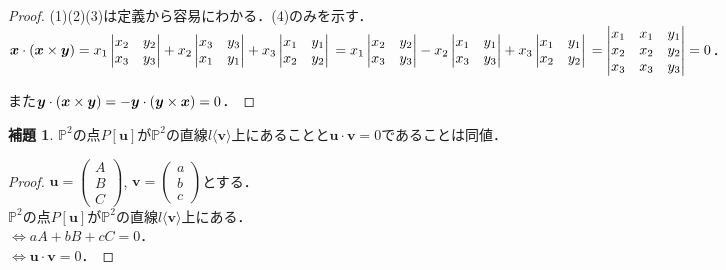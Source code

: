 \documentclass{jsarticle}
\theoremstyle{definition}
\newtheorem{lemma}[theorem]{補題}
\numberwithin{theorem}{section}
\numberwithin{equation}{section}
\begin{document}
\begin{proof}
    (1)(2)(3)は定義から容易にわかる．(4)のみを示す．
    \\$\bm{x}\cdot(\bm{x}\times\bm{y})
    \\=x_1\begin{vmatrix}
       x_2&y_2\\x_3&y_3 
    \end{vmatrix}+x_2\begin{vmatrix}
        x_3&y_3\\x_1&y_1
    \end{vmatrix}+x_3\begin{vmatrix}
        x_1&y_1\\x_2&y_2
    \end{vmatrix}
    \\=x_1\begin{vmatrix}
       x_2&y_2\\x_3&y_3 
    \end{vmatrix}-x_2\begin{vmatrix}
        x_1&y_1\\x_3&y_3
    \end{vmatrix}+x_3\begin{vmatrix}
        x_1&y_1\\x_2&y_2
    \end{vmatrix}
    \\=\begin{vmatrix}
        x_1&x_1&y_1
        \\x_2&x_2&y_2
        \\x_3&x_3&y_3
    \end{vmatrix}=0$．
    \par また$\\\bm{y}\cdot(\bm{x}\times\bm{y})
    \\=-\bm{y}\cdot(\bm{y}\times\bm{x})=0$．
\end{proof}
\begin{lemma}
$\mathbb{P}^2$の点$P[\bm{u}]$が$\mathbb{P}^2$の直線$l\langle \bm{v}\rangle $上にあることと$\bm{u}\cdot \bm{v}=0$であることは同値．
\end{lemma}
\begin{proof}
$\bm{u}=\begin{pmatrix} A \\ B \\ C \end{pmatrix}$, $\bm{v}=\begin{pmatrix} a \\ b \\ c \end{pmatrix}$とする．
\\$\mathbb{P}^2$の点$P[\bm{u}]$が$\mathbb{P}^2$の直線$l\langle \bm{v}\rangle $上にある．
\\$\Leftrightarrow aA+bB+cC=0$．
\\$\Leftrightarrow \bm{u}\cdot \bm{v}=0$．
\end{proof}
\end{document}

